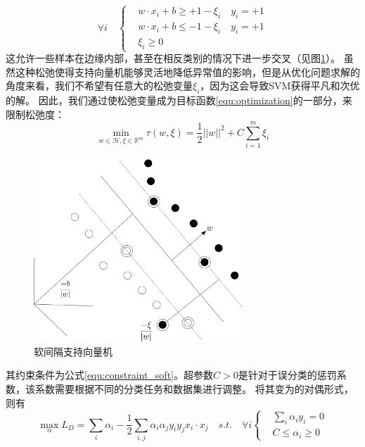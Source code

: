 \begin{equation}
	\forall i \quad
	\left\{
	 \begin{aligned}
	&w\cdot x_i + b \geq +1-\xi_i \quad y_i=+1  \\
	&w\cdot x_i + b \leq -1-\xi_i \quad y_i=+1  \\
	&\xi_i \geq 0
	\end{aligned}
	 \right.
	\label{equ:constraint_soft}
\end{equation}
这允许一些样本在边缘内部，甚至在相反类别的情况下进一步交叉（见图\ref{fig:softmargin}）。 虽然这种松弛使得支持向量机能够灵活地降低异常值的影响，但是从优化问题求解的角度来看，我们不希望有任意大的松弛变量$\xi_i$，因为这会导致SVM获得平凡和次优的解。 因此，我们通过使松弛变量成为目标函数\ref{equ:optimization}的一部分，来限制松弛度：
\begin{equation}
	\min \limits_{w\in \mathcal{H},\xi\in \mathbb{R}^m} \tau(w,\xi)=\frac{1}{2}||w||^2+C\sum_{i=1}^m {\xi_i}
\end{equation}
\begin{figure}[H]
	\centering
	\includegraphics[width=0.7\textwidth]{figures/emitter/svm_soft}
	\caption{软间隔支持向量机}
	\label{fig:softmargin}
\end{figure}
其约束条件为公式\ref{equ:constraint_soft}。超参数$C>0$是针对于误分类的惩罚系数，该系数需要根据不同的分类任务和数据集进行调整。
将其变为的对偶形式，则有
\begin{equation}
	\max \limits_{\alpha} L_D=\sum_i{\alpha_i}-\frac{1}{2}\sum_{i,j}\alpha_i\alpha_jy_iy_jx_i\cdot x_j \quad s.t. \quad \forall i
	\left\{
		\begin{aligned}
	   &\sum_i{\alpha_iy_i}=0  \\
	   &C \leq \alpha_i \geq 0
	   \end{aligned}
		\right.
	\label{equ:cdotdual}
\end{equation}

